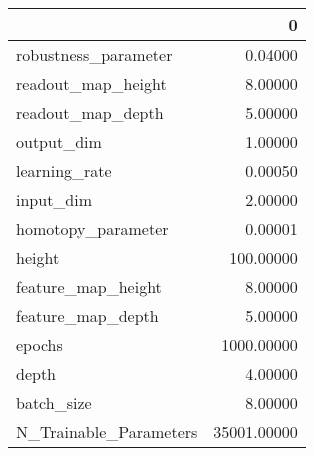 \begin{tabular}{lr}
\toprule
{} &            0 \\
\midrule
robustness\_parameter   &      0.04000 \\
readout\_map\_height     &      8.00000 \\
readout\_map\_depth      &      5.00000 \\
output\_dim             &      1.00000 \\
learning\_rate          &      0.00050 \\
input\_dim              &      2.00000 \\
homotopy\_parameter     &      0.00001 \\
height                 &    100.00000 \\
feature\_map\_height     &      8.00000 \\
feature\_map\_depth      &      5.00000 \\
epochs                 &   1000.00000 \\
depth                  &      4.00000 \\
batch\_size             &      8.00000 \\
N\_Trainable\_Parameters &  35001.00000 \\
\bottomrule
\end{tabular}
